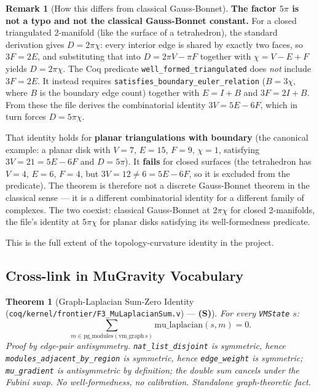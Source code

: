 \documentclass[11pt, a4paper]{report}
\theoremstyle{definition}
\newtheorem{remark}{Remark}[chapter]
\theoremstyle{plain}
\newtheorem{theorem}{Theorem}[chapter]
\begin{document}
\begin{remark}[How this differs from classical Gauss-Bonnet]
\textbf{The factor $5\pi$ is not a typo and not the classical Gauss-Bonnet constant.} For a closed triangulated 2-manifold (like the surface of a tetrahedron), the standard derivation gives $D = 2\pi\chi$: every interior edge is shared by exactly two faces, so $3F = 2E$, and substituting that into $D = 2\pi V - \pi F$ together with $\chi = V - E + F$ yields $D = 2\pi\chi$. The Coq predicate \texttt{well\_formed\_triangulated} does \emph{not} include $3F = 2E$. It instead requires \texttt{satisfies\_boundary\_euler\_relation} ($B = 3\chi$, where $B$ is the boundary edge count) together with $E = I + B$ and $3F = 2I + B$. From these the file derives the combinatorial identity $3V = 5E - 6F$, which in turn forces $D = 5\pi\chi$.

That identity holds for \textbf{planar triangulations with boundary} (the canonical example: a planar disk with $V=7$, $E=15$, $F=9$, $\chi=1$, satisfying $3V = 21 = 5E - 6F$ and $D = 5\pi$). It \textbf{fails} for closed surfaces (the tetrahedron has $V=4$, $E=6$, $F=4$, but $3V = 12 \neq 6 = 5E - 6F$, so it is excluded from the predicate). The theorem is therefore not a discrete Gauss-Bonnet theorem in the classical sense — it is a different combinatorial identity for a different family of complexes. The two coexist: classical Gauss-Bonnet at $2\pi\chi$ for closed 2-manifolds, the file's identity at $5\pi\chi$ for planar disks satisfying its well-formedness predicate.

This is the full extent of the topology-curvature identity in the project.
\end{remark}

\subsection{Cross-link in MuGravity Vocabulary}

\begin{theorem}[Graph-Laplacian Sum-Zero Identity {\normalfont (\texttt{coq/kernel/frontier/F3\_MuLaplacianSum.v})} --- \textbf{(S)}]
\label{thm:total_mu_laplacian_zero}
For every \texttt{VMState} $s$:
\[
\sum_{m \in \mathrm{pg\_modules}(\mathrm{vm\_graph}\,s)} \mathrm{mu\_laplacian}(s, m) = 0.
\]
Proof by edge-pair antisymmetry. \texttt{nat\_list\_disjoint} is symmetric, hence \texttt{modules\_adjacent\_by\_region} is symmetric, hence \texttt{edge\_weight} is symmetric; \texttt{mu\_gradient} is antisymmetric by definition; the double sum cancels under the Fubini swap. No well-formedness, no calibration. Standalone graph-theoretic fact.
\end{theorem}
\end{document}
